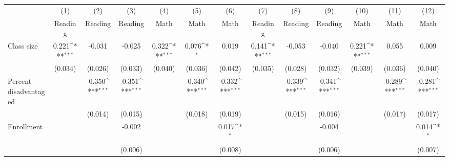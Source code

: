 {
\def\sym#1{\ifmmode^{#1}\else\(^{#1}\)\fi}
\begin{tabular}{l*{12}{c}}
\toprule
            &\multicolumn{1}{c}{(1)}&\multicolumn{1}{c}{(2)}&\multicolumn{1}{c}{(3)}&\multicolumn{1}{c}{(4)}&\multicolumn{1}{c}{(5)}&\multicolumn{1}{c}{(6)}&\multicolumn{1}{c}{(7)}&\multicolumn{1}{c}{(8)}&\multicolumn{1}{c}{(9)}&\multicolumn{1}{c}{(10)}&\multicolumn{1}{c}{(11)}&\multicolumn{1}{c}{(12)}\\
            &\multicolumn{1}{c}{Reading}&\multicolumn{1}{c}{Reading}&\multicolumn{1}{c}{Reading}&\multicolumn{1}{c}{Math}&\multicolumn{1}{c}{Math}&\multicolumn{1}{c}{Math}&\multicolumn{1}{c}{Reading}&\multicolumn{1}{c}{Reading}&\multicolumn{1}{c}{Reading}&\multicolumn{1}{c}{Math}&\multicolumn{1}{c}{Math}&\multicolumn{1}{c}{Math}\\
\midrule
Class size  &       0.221\sym{***}&      -0.031         &      -0.025         &       0.322\sym{***}&       0.076\sym{*}  &       0.019         &       0.141\sym{***}&      -0.053         &      -0.040         &       0.221\sym{***}&       0.055         &       0.009         \\
            &     (0.034)         &     (0.026)         &     (0.033)         &     (0.040)         &     (0.036)         &     (0.042)         &     (0.035)         &     (0.028)         &     (0.032)         &     (0.039)         &     (0.036)         &     (0.040)         \\
\addlinespace
Percent disadvantaged&                     &      -0.350\sym{***}&      -0.351\sym{***}&                     &      -0.340\sym{***}&      -0.332\sym{***}&                     &      -0.339\sym{***}&      -0.341\sym{***}&                     &      -0.289\sym{***}&      -0.281\sym{***}\\
            &                     &     (0.014)         &     (0.015)         &                     &     (0.018)         &     (0.019)         &                     &     (0.015)         &     (0.016)         &                     &     (0.017)         &     (0.017)         \\
\addlinespace
Enrollment  &                     &                     &      -0.002         &                     &                     &       0.017\sym{*}  &                     &                     &      -0.004         &                     &                     &       0.014\sym{*}  \\
            &                     &                     &     (0.006)         &                     &                     &     (0.008)         &                     &                     &     (0.006)         &                     &                     &     (0.007)         \\

\end{tabular}}
